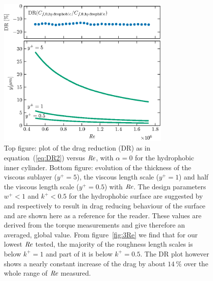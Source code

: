 \begin{figure}
\centering \includegraphics[width=0.76\textwidth]{Figures/fig5}
\caption{Top figure: plot of the drag reduction (DR) as in equation~(\ref{eq:DR2}) versus $\mbox{\textit{Re}}$, with $\alpha = 0$ for the {hydrophobic} inner cylinder. Bottom figure: evolution of the thickness of the viscous sublayer ($y^+ = 5$), the viscous length scale ($y^+ = 1$) and half the viscous length scale ($y^+ = 0.5$) with $\mbox{\textit{Re}}$. The design parameters $w^+ < 1$ and $k^+ < 0.5$ for the {hydrophobic} surface are suggested by \cite{Park2014} and \citep{Bidkar2014} respectively to result in drag reducing behaviour of the surface and are shown here as a reference for the reader. These values are derived from the torque measurements and give therefore an averaged, global value. From figure~\ref{fig:3Re} we find that for our lowest $\mbox{\textit{Re}}$ tested, the majority of the roughness length scales is below $k^+ = 1$ and part of it is below $k^+ = 0.5$. The DR plot however shows a nearly constant increase of the drag by about $\SI{14}{\%}$ over the whole range of $\mbox{\textit{Re}}$ measured.} \label{fig:DR_delta_nu_Dp_groupplot}
\end{figure}

